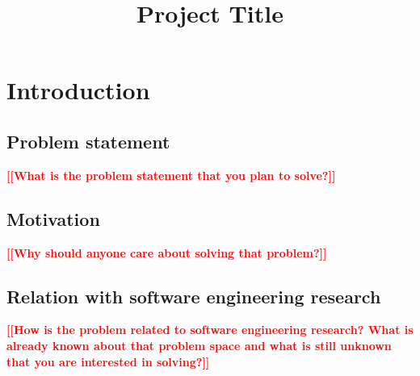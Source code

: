 \documentclass[conference]{IEEEtran}
\newcommand{\todo}[1]{\textcolor{red}{{\bfseries [[#1]]}}}
\begin{document}
\title{Project Title}

\author{
\and
{}
\and
{}
}

\maketitle

\begin{abstract}
\end{abstract}

\begin{IEEEkeywords}

\end{IEEEkeywords}

\section{Introduction}
\label{sec:introduction}

\subsection{Problem statement}
    \todo{What is the problem statement that you plan to solve?}

\subsection{Motivation}
    \todo{Why should anyone care about solving that problem?}

\subsection{Relation with software engineering research}
    \todo{How is the problem related to software engineering research? What is already known about that problem space and what is still unknown that you are interested in solving?}
\end{document}
